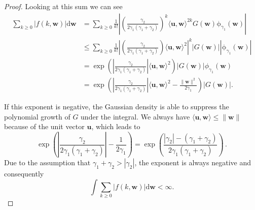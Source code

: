 \begin{proof}
    Looking at this sum we can see
    \begin{align*}
        \sum_{k \geq 0} |f(k, \bm w)| \mathrm d \bm w  &= \sum_{k\geq 0}\frac{1}{k!}\left|\left(\frac{\gamma_2}{2\gamma_1(\gamma_1+\gamma_2)}\right)^k \langle \bm u, \bm w\rangle^{2k} G(\bm w)\mathrm \phi_{\gamma_1}(\bm w)\right| \\
        &\leq \sum_{k\geq 0} \frac{1}{k!}\left|\left(\frac{\gamma_2}{2\gamma_1(\gamma_1+\gamma_2)}\right) \langle \bm u, \bm w\rangle^{2}\right|^k |G(\bm w)||\mathrm \phi_{\gamma_1}(\bm w)| \\
        &= \exp\left(\left|\frac{\gamma_2}{2\gamma_1(\gamma_1+\gamma_2)}\right| \langle \bm u, \bm w\rangle^{2}\right) |G(\bm w)\mathrm| \phi_{\gamma_1}(\bm w)\\
        &= \exp\left(\left|\frac{\gamma_2}{2\gamma_1(\gamma_1+\gamma_2)}\right| \langle \bm u, \bm w\rangle^{2} - \frac{\|\bm w\|^2}{2\gamma_1}\right) |G(\bm w)|.
    \end{align*}

    If this exponent is negative, the Gaussian density is able to suppress the polynomial growth of $G$ under the integral. We always have $\langle \bm u, \bm w \rangle \leq \| \bm w \|$ because of the unit vector $\bm u$, which leads to
    \[
     \exp\left(\left|\frac{\gamma_2}{2\gamma_1(\gamma_1+\gamma_2)}\right|  - \frac{1}{2\gamma_1}\right) = \exp\left(\frac{|\gamma_2| - (\gamma _1 + \gamma_2)}{2\gamma_1(\gamma_1+\gamma_2)}\right)\,.
    \]
    Due to the assumption that $\gamma_1 + \gamma_2 > |\gamma_2|$, the exponent is always negative and consequently
    \[
        \int \sum_{k \geq 0} |f(k, \bm w)| \mathrm d \bm w < \infty.
    \]


\end{proof}
